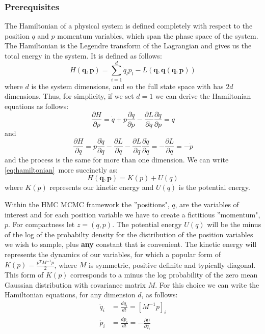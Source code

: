 \documentclass[]{report}
\begin{document}
\subsubsection{Prerequisites}
The Hamiltonian of a physical system is defined completely with respect to the position $q$ and $p$ momentum variables, which span the phase space of the system. The Hamiltonian is the Legendre transform of the Lagrangian and gives us the total energy in the system. It is defined as follows: 
\begin{equation}
\label{eq:hamiltonian}
 H(\textbf{q},\textbf{p}) = \sum_{i = 1}^{d}\dot{q}_{l}p_{l} - L(\textbf{q}, \textbf{\.{q}}(\textbf{q}, \textbf{p}))
\end{equation}
where $d$ is the system dimensions, and so the full state space with has $2d$ dimensions.  
Thus, for simplicity, if we set $d = 1$ we can derive the Hamiltonian equations as follows:\begin{equation}
\frac{\partial H}{\partial p} = \dot{q} + p\frac{\partial \dot{q}}{\partial p} - \frac{\partial L}{\partial \dot{q}}\frac{\partial \dot{q}}{\partial p} = \dot{q} \end{equation}
and 
\begin{equation}
\frac{\partial H}{\partial q} = p\frac{\partial \dot{q}}{\partial q} - \frac{\partial L}{\partial q} - \frac{\partial L}{\partial \dot{q}}\frac{\partial \dot{q}}{\partial q} = - \frac{\partial L}{\partial q}= -\dot{p}  \end{equation}
and the process is the same for more than one dimension. 
We can write \ref{eq:hamiltonian}\ more succinctly as:
\begin{equation}
\label{eq:hamreduced}
H(\textbf{q}, \textbf{p})  = K(p) + U(q)
\end{equation}
where $K(p)$ represents our kinetic energy and $U(q)$ is the potential energy.

Within the HMC MCMC framework the ''positions", $q$, are the variables of interest and for each position variable we have to create a fictitious ''momentum", $p$. For compactness let $z = (q,p)$. The potential energy $U(q)$ will be the minus of the log of the probabilty density for the distribution of the position variables we wish to sample, plus \textbf{any} constant that is convenient.  The kinetic energy will represents the dynamics of our variables, for which a popular form of $K(p) = \frac{p^{T} M^{-1} p}{2}$, where $M$ is symmetric, positive definite and typically diagonal. This form of $K(p)$ corresponds to a minus the log probability of the zero mean Gaussian distribution with covariance matrix $M$. For this choice we can write the Hamiltonian equations, for any dimension $d$, as follows:
\begin{align}
\dot{q}_{i} &= \frac{dq_{i}}{dt} = [M^{-1}p]_{i} \\
\dot{p}_{i} &= \frac{dp_{i}}{dt} = -\frac{\partial U}{\partial q_{i}}
\end{align}
\end{document}
